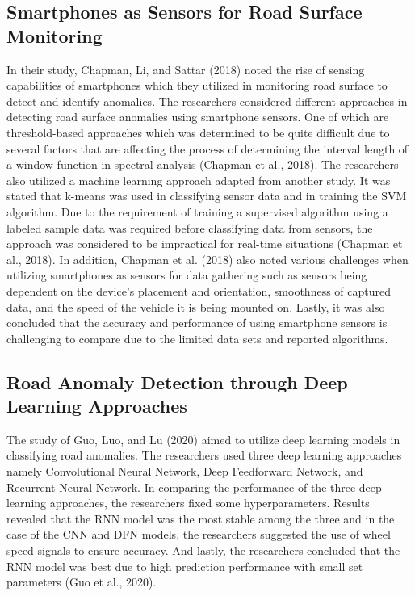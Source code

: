 \documentclass{report} %
\begin{document}
	\subsection{Smartphones as Sensors for Road Surface Monitoring}
		In their study, Chapman, Li, and Sattar (2018) noted the rise of sensing capabilities of smartphones which they utilized in monitoring road surface to detect and identify anomalies. The researchers considered different approaches in detecting road surface anomalies using smartphone sensors. One of which are threshold-based approaches which was determined to be quite difficult  due to several factors that are affecting the process of determining the interval length of a window function in spectral analysis (Chapman et al., 2018). The researchers also utilized a machine learning approach adapted from another study. It was stated that k-means was used in classifying sensor data and in training the SVM algorithm. Due to the requirement of training a supervised algorithm using a labeled sample data was required before classifying data from sensors, the approach was considered to be impractical for real-time situations (Chapman et al., 2018). In addition, Chapman et al. (2018) also noted various challenges when utilizing smartphones as sensors for data gathering such as sensors being dependent on the device’s placement and orientation, smoothness of captured data, and the speed of the vehicle it is being mounted on. Lastly, it was also concluded that the accuracy and performance of using smartphone sensors is challenging to compare due to the limited data sets and reported algorithms.

	
	\subsection{Road Anomaly Detection through Deep Learning Approaches}
		The study of Guo, Luo, and Lu (2020) aimed to utilize deep learning models in classifying road anomalies. The researchers used three deep learning approaches namely Convolutional Neural Network, Deep Feedforward Network, and Recurrent Neural Network. In comparing the performance of the three deep learning approaches, the researchers fixed some hyperparameters. Results revealed that the RNN model was the most stable among the three and in the case of the CNN and DFN models, the researchers suggested the use of wheel speed signals to ensure accuracy. And lastly, the researchers concluded that the RNN model was best due to high prediction performance with small set parameters (Guo et al., 2020).
\end{document}
